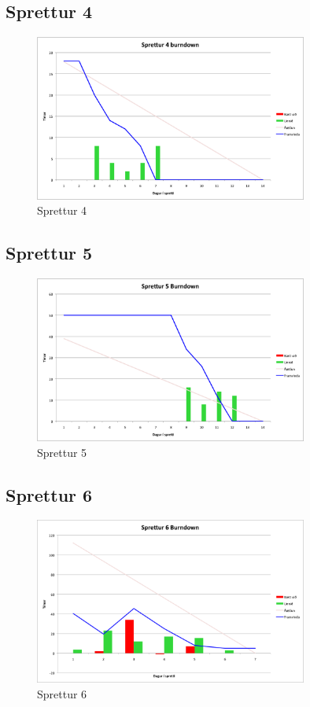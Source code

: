 \documentclass{article}
\begin{document}
\subsection{Sprettur 4}

\begin{figure}[H]
  \centering
  \includegraphics[width=0.8\textwidth]{Sprettur4_Burndown.png} 
  \caption{Sprettur 4} 
\end{figure}

\subsection{Sprettur 5}

\begin{figure}[H]
  \centering
  \includegraphics[width=0.8\textwidth]{Sprettur5_Burndown.png} 
  \caption{Sprettur 5} 
\end{figure}

\subsection{Sprettur 6}

\begin{figure}[H]
  \centering
  \includegraphics[width=0.8\textwidth]{Sprettur6_Burndown.png} 
  \caption{Sprettur 6} 
\end{figure}
\end{document}
